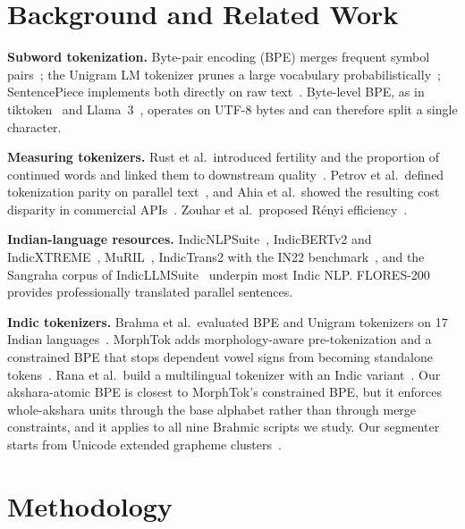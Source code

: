 \documentclass[conference]{IEEEtran}
\begin{document}
\section{Background and Related Work}
\textbf{Subword tokenization.} Byte-pair encoding (BPE) merges frequent symbol pairs~\cite{sennrich-etal-2016-neural}; the Unigram LM tokenizer prunes a large vocabulary probabilistically~\cite{kudo-2018-subword}; SentencePiece implements both directly on raw text~\cite{kudo-richardson-2018-sentencepiece}. Byte-level BPE, as in tiktoken~\cite{openai2023tiktoken} and Llama~3~\cite{grattafiori2024llama3}, operates on UTF-8 bytes and can therefore split a single character.

\textbf{Measuring tokenizers.} Rust et al.\ introduced fertility and the proportion of continued words and linked them to downstream quality~\cite{rust-etal-2021-good}. Petrov et al.\ defined tokenization parity on parallel text~\cite{petrov2023unfairness}, and Ahia et al.\ showed the resulting cost disparity in commercial APIs~\cite{ahia-etal-2023-languages}. Zouhar et al.\ proposed Rényi efficiency~\cite{zouhar-etal-2023-tokenization}.

\textbf{Indian-language resources.} IndicNLPSuite~\cite{kakwani-etal-2020-indicnlpsuite}, IndicBERTv2 and IndicXTREME~\cite{doddapaneni-etal-2023-towards}, MuRIL~\cite{khanuja2021muril}, IndicTrans2 with the IN22 benchmark~\cite{gala2023indictrans2}, and the Sangraha corpus of IndicLLMSuite~\cite{khan-etal-2024-indicllmsuite} underpin most Indic NLP. FLORES-200~\cite{goyal-etal-2022-flores,nllb2022} provides professionally translated parallel sentences.

\textbf{Indic tokenizers.} Brahma et al.\ evaluated BPE and Unigram tokenizers on 17 Indian languages~\cite{brahma2025lens}. MorphTok adds morphology-aware pre-tokenization and a constrained BPE that stops dependent vowel signs from becoming standalone tokens~\cite{brahma2025morphtok}. Rana et al.\ build a multilingual tokenizer with an Indic variant~\cite{rana2025mutant}. Our akshara-atomic BPE is closest to MorphTok's constrained BPE, but it enforces whole-akshara units through the base alphabet rather than through merge constraints, and it applies to all nine Brahmic scripts we study. Our segmenter starts from Unicode extended grapheme clusters~\cite{unicode2025uax29}.

\section{Methodology}
\end{document}
